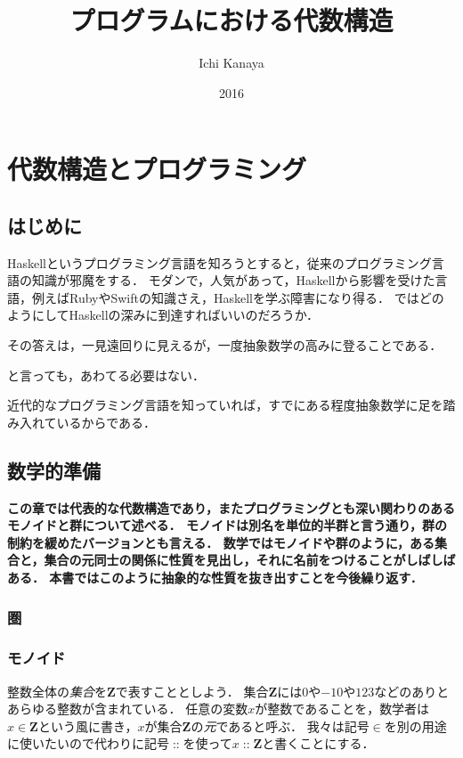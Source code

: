 \documentclass[twocolumn]{jsbook}
\title{プログラムにおける代数構造}
\author{Ichi Kanaya}
\date{2016}
\newcommand{\keyword}[1]{\emph{#1}}
\newenvironment{leader}{\begingroup\bf}{\endgroup}
\newcommand{\istypeof}{\mathop{::}}
\newcommand{\mathsetname}[1]{\boldsymbol{#1}}
\begin{document}
\maketitle
\tableofcontents

\part{代数構造とプログラミング}

\chapter{はじめに}

Haskellというプログラミング言語を知ろうとすると，従来のプログラミング言語の知識が邪魔をする．
モダンで，人気があって，Haskellから影響を受けた言語，例えばRubyやSwiftの知識さえ，Haskellを学ぶ障害になり得る．
ではどのようにしてHaskellの深みに到達すればいいのだろうか．

その答えは，一見遠回りに見えるが，一度抽象数学の高みに登ることである．

と言っても，あわてる必要はない．

近代的なプログラミング言語を知っていれば，すでにある程度抽象数学に足を踏み入れているからである．

\chapter{数学的準備}

\begin{leader}
この章では代表的な代数構造であり，またプログラミングとも深い関わりのあるモノイドと群について述べる．
モノイドは別名を単位的半群と言う通り，群の制約を緩めたバージョンとも言える．
数学ではモノイドや群のように，ある集合と，集合の元同士の関係に性質を見出し，それに名前をつけることがしばしばある．
本書ではこのように抽象的な性質を抜き出すことを今後繰り返す．
\end{leader}

\section{圏}

\section{モノイド}

整数全体の\keyword{集合}を$\mathsetname{Z}$で表すこととしよう．
集合$\mathsetname{Z}$には$0$や$-10$や$123$などのありとあらゆる整数が含まれている．
任意の変数$x$が整数であることを，数学者は$x\in\mathsetname{Z}$という風に書き，$x$が集合$\mathsetname{Z}$の\keyword{元}であると呼ぶ．
我々は記号$\in$を別の用途に使いたいので代わりに記号$\istypeof$を使って$x\istypeof\mathsetname{Z}$と書くことにする．
\end{document}
